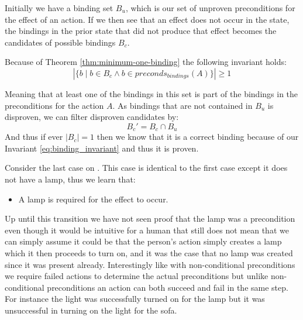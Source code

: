 \documentclass[../Master.tex]{subfiles}
\begin{document}
Initially we have a binding set $B_u$, which is our set of unproven preconditions for the effect of an action.
If we then see that an effect does not occur in the state, the bindings in the prior state that did not produce that effect becomes the candidates of possible bindings $B_c$.

Because of Theorem \ref{thm:minimum-one-binding} the following invariant holds:
\begin{equation} \label{eq:binding_invariant}
\left| \{b  \mid  b \in B_c \land b \in preconds_{bindings}(A)\} \right|  \ge 1
\end{equation}


Meaning that at least one of the bindings in this set is part of the bindings in the preconditions for the action $A$. As bindings that are not contained in $B_u$ is disproven, we can filter disproven candidates by:
\begin{equation}
B_c' = B_c \cap B_u
\end{equation}
And thus if ever $|B_c| = 1$ then we know that it is a correct binding because of our Invariant \ref{eq:binding_invariant} and thus it is proven.

 \begin{example}\label{ex:ca:light-on-3}
 Consider the last case on . This case is identical
to the first case except it does not have a lamp, thus we learn that:
\begin{itemize}
	\item A lamp is required for the effect to occur.
\end{itemize}
Up until this transition we have not seen proof that the lamp was a precondition even though it would be intuitive for a human that still
does not mean that we can simply assume it could be that the person's action simply creates a
lamp which it then proceeds to turn on, and it was the case that no
lamp was created since it was present already.
Interestingly like with non-conditional preconditions we require failed actions to determine the actual preconditions but unlike non-conditional preconditions an action can both succeed and fail in the same step. For instance the light was successfully turned on for the lamp but it was unsuccessful in turning on the light for the sofa.

\end{example}
\end{document}
